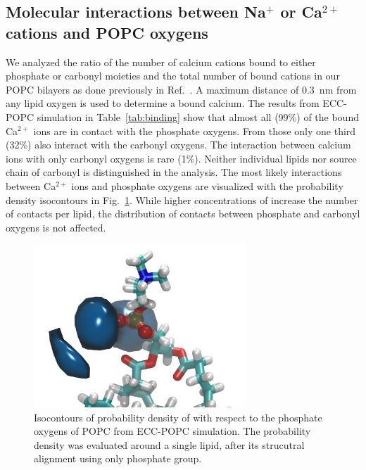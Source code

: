 \documentclass[aip,jcp,twocolumn]{revtex4}
\begin{document}
\subsection{Molecular interactions between Na$^+$ or Ca$^{2+}$ cations and POPC oxygens}
We analyzed the ratio of the number of calcium cations bound to either phosphate or carbonyl moieties and the total number of bound cations in our POPC bilayers as done previously in Ref.~. A maximum distance of 0.3~nm from any lipid oxygen is used to determine a bound calcium. The results from ECC-POPC simulation in Table~\ref{tab:binding} show that almost all (99\%) of the bound Ca$^{2+}$ ions are in contact with the phosphate oxygens. From those only one third (32\%) also interact with the carbonyl oxygens. The interaction between calcium ions with only carbonyl oxygens is rare (1\%). Neither individual lipids nor source chain of carbonyl is distinguished in the analysis. The most likely interactions between Ca$^{2+}$ ions and phosphate oxygens are visualized with the probability density isocontours in Fig.~\ref{fig:volmaps}. While higher concentrations of  increase the number of contacts per lipid, the distribution of contacts between phosphate and carbonyl oxygens is not affected.

\begin{figure}[tb!]
  \centering
  \includegraphics[width=8.0cm]{../Fig/volmap_resid10_Ca_Cl_PO4Cent.png} %
  \caption{\label{fig:volmaps}
      Isocontours of probability density of  with respect to 
      the phosphate oxygens of POPC from ECC-POPC simulation.
      The probability density was evaluated around a single lipid, 
      after its strucutral alignment using only phosphate group. 
  }
\end{figure}
\end{document}
